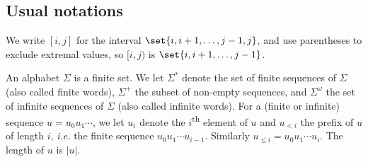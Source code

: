 \subsection*{Usual notations}
We write $[i,j]$ for the interval $\set{i,i+1,\dots,j-1,j}$, and use parentheses to exclude extremal values,
so $[i,j)$ is $\set{i,i+1,\dots,j-1}$.

An alphabet $\Sigma$ is a finite set. 
We let $\Sigma^*$ denote the set of finite sequences of $\Sigma$ (also called finite words),
$\Sigma^+$ the subset of non-empty sequences, and $\Sigma^\omega$ the set of infinite sequences of $\Sigma$ (also called infinite words).
For a (finite or infinite) sequence $u = u_0 u_1 \cdots$, we let $u_i$ denote the $i$\textsuperscript{th} element of $u$
and $u_{< i}$ the prefix of $u$ of length $i$, \textit{i.e.} the finite sequence $u_0 u_1 \cdots u_{i-1}$.
Similarly $u_{\le i} = u_0 u_1 \cdots u_i$.
The length of $u$ is $|u|$.
